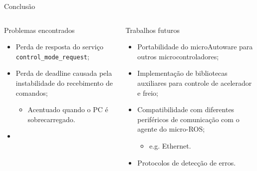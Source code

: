 \documentclass{if-beamer}
\begin{document}
\begin{frame}{Conclusão}
	
	\begin{columns}
		
		\begin{column}{0.435\textwidth}
			
			\begin{block}{Problemas encontrados}
				
				\begin{itemize}
					\item Perda de resposta do serviço \texttt{control\_mode\_request};	
					\pause
					\item Perda de deadline causada pela instabilidade do recebimento de comandos;	
					\pause
					\begin{itemize}
						\item Acentuado quando o PC é sobrecarregado.
					\end{itemize}	
					\pause
					\item 
				\end{itemize}
				
			\end{block}
			
		\end{column}
	
\pause
		
		\begin{column}{0.435\textwidth}
			
			\begin{block}{Trabalhos futuros}
				
				\begin{itemize}
					\item Portabilidade do microAutoware para outros microcontroladores;	
					\pause
					\item Implementação de bibliotecas auxiliares para controle de acelerador e freio;	
					\pause
					\item Compatibilidade com diferentes periféricos de comunicação com o agente do micro-ROS;
					\begin{itemize}
						\item e.g. Ethernet.						
					\end{itemize}	
					\pause
					\item Protocolos de detecção de erros.
				\end{itemize}
				
			\end{block}
			
		\end{column}
		

\end{columns}
\end{frame}
\end{document}

